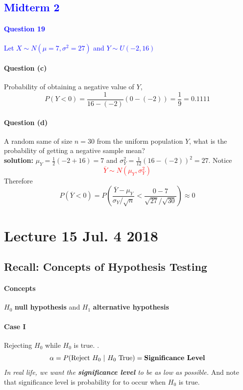 \documentclass{article}
\begin{document}
	\textcolor{blue}{
		\section*{Midterm 2}
		\paragraph{Question 19} Let $X \sim N(\mu=7, \sigma^2=27)$ and $Y \sim U(-2, 16)$
		}
		\paragraph{Question (c)} Probability of obtaining a negative value of $Y$,
			\[
				P(Y < 0) = \frac{1}{16-(-2)} (0 - (-2)) = \frac{1}{9} = 0.1111
			\]
		\paragraph{Question (d)} A random same of size $n=30$ from the uniform population $Y$, what is the probability of getting a negative sample mean?
		\\
		\textbf{solution:} $\mu_Y = \frac{1}{2}(-2+16) = 7$ and $\sigma_Y^2 = \frac{1}{12}(16-(-2))^2 = 27$. Notice \textcolor{red}{ 
			\[\overline{Y} \sim N(\mu_Y, \sigma_Y^2)\]
			}
		Therefore
		\[
			P(\overline{Y} < 0) = P(\frac{\overline{Y} - \mu_Y}{\sigma_Y/\sqrt{n}} < \frac{0 - 7}{\sqrt{27}/\sqrt{30}}) \approx 0
		\]
	
	\section{Lecture 15 Jul. 4 2018}
		\subsection{Recall: Concepts of Hypothesis Testing}
			\paragraph{Concepts} $H_0$ \textbf{null hypothesis} and $H_1$ \textbf{alternative hypothesis}
			
			\paragraph{Case I} Rejecting $H_0$ while $H_0$ is true. .
				\[
					\alpha = P(\tx{Reject }H_0\ \vert \ H_0 \tx{ True})= \textbf{Significance Level}
				\]
				\emph{In real life, we want the \textbf{significance level} to be as low as possible.} And note that significance level is probability for  to occur when $H_0$ is true.
				
\end{document}
